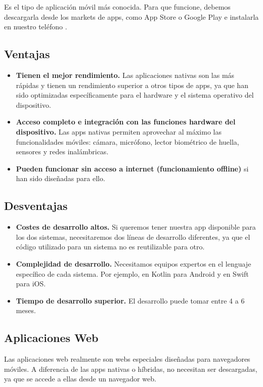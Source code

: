 Es el tipo de aplicación móvil más conocida. Para que funcione, debemos descargarla desde los markets de apps, como App Store o Google Play e instalarla en nuestro teléfono \cite{CitaA02}.

\subsection*{Ventajas}
\begin{itemize}
	\item \textbf{Tienen el mejor rendimiento.} Las aplicaciones nativas son las más rápidas y tienen un rendimiento superior a otros tipos de apps, ya que han sido optimizadas específicamente para el hardware y el sistema operativo del dispositivo.
	\item \textbf{Acceso completo e integración con las funciones hardware del dispositivo.} Las apps nativas permiten aprovechar al máximo las funcionalidades móviles: cámara, micrófono, lector biométrico de huella, sensores y redes inalámbricas.
	\item \textbf{Pueden funcionar sin acceso a internet (funcionamiento offline)} si han sido diseñadas para ello.
\end{itemize}

\subsection*{Desventajas}
\begin{itemize}
	\item \textbf{Costes de desarrollo altos.} Si queremos tener nuestra app disponible para los dos sistemas, necesitaremos dos líneas de desarrollo diferentes, ya que el código utilizado para un sistema no es reutilizable para otro.
	\item \textbf{Complejidad de desarrollo.} Necesitamos equipos expertos en el lenguaje específico de cada sistema. Por ejemplo, en Kotlin para Android y en Swift para iOS.
	\item \textbf{Tiempo de desarrollo superior.} El desarrollo puede tomar entre 4 a 6 meses.
\end{itemize}

\subsection{Aplicaciones Web}
Las aplicaciones web realmente son webs especiales diseñadas para navegadores móviles. A diferencia de las apps nativas o híbridas, no necesitan ser descargadas, ya que se accede a ellas desde un navegador web.

